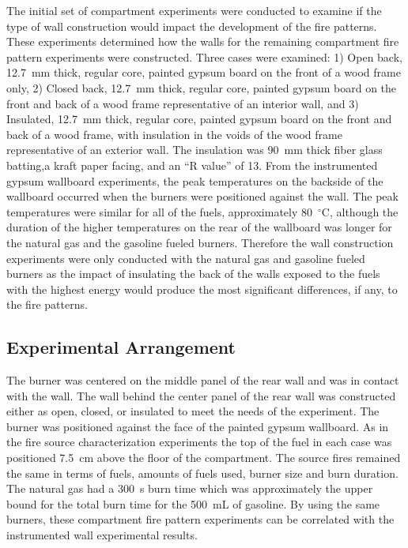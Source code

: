 \documentclass[twoside]{uocthesis}
\begin{document}
 The initial set of compartment experiments were conducted to examine if the type of wall construction would impact the development of the fire patterns. These experiments determined how the walls for the remaining compartment fire pattern experiments were constructed.  Three cases were examined: 1) Open back, 12.7~mm thick, regular core, painted gypsum board on the front of a wood frame only, 2) Closed back, 12.7~mm thick, regular core, painted gypsum board on the front and back of a wood frame representative of an interior wall, and 3) Insulated, 12.7~mm thick, regular core, painted gypsum board on the front and back of a wood frame, with insulation in the voids of the wood frame representative of an exterior wall. The insulation was 90~mm thick fiber glass batting,a kraft paper facing, and an ``R value'' of 13.  From the instrumented gypsum wallboard experiments, the peak temperatures on the backside of the wallboard occurred when the burners were positioned against the wall.  The peak temperatures were similar for all of the fuels, approximately 80~$^\circ$C, although the duration of the higher temperatures on the rear of the wallboard was longer for the natural gas and the gasoline fueled burners. Therefore the wall construction experiments were only conducted with the natural gas and gasoline fueled burners as the impact of insulating the back of the walls exposed to the fuels with the highest energy would produce the most significant differences, if any, to the fire patterns.


\subsection{Experimental Arrangement}

The burner was centered on the middle panel of the rear wall and was in contact with the wall. The wall behind the center panel of the rear wall was constructed either as open, closed, or insulated to meet the needs of the experiment. The burner was positioned against the face of the painted gypsum wallboard. As in the fire source characterization experiments the top of the fuel in each case was positioned 7.5~cm above the floor of the compartment. The source fires remained the same in terms of fuels, amounts of fuels used, burner size and burn duration.  The natural gas had a 300~s burn time which was approximately the upper bound for the total burn time for the 500~mL of gasoline.  By using the same burners, these compartment fire pattern experiments can be correlated with the instrumented wall experimental results.
\end{document}
